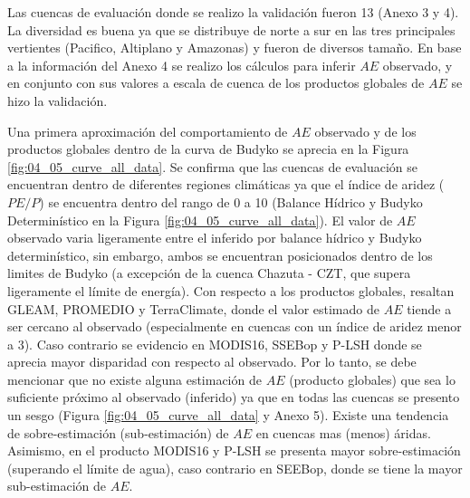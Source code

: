 \documentclass[12pt]{article}
\begin{document}
\clearpage

\clearpage

\clearpage
Las cuencas de evaluación donde se realizo la validación fueron 13 (Anexo 3 y 4). La diversidad es buena ya que se distribuye de norte a sur en las tres principales vertientes (Pacifico, Altiplano y Amazonas) y fueron de diversos tamaño. En base a la información del Anexo 4 se realizo los cálculos para inferir $AE$ observado, y en conjunto con sus valores a escala de cuenca de los productos globales de $AE$ se hizo la validación. 

Una primera aproximación del comportamiento de $AE$ observado y de los productos globales dentro de la curva de Budyko se aprecia en la Figura \ref{fig:04_05_curve_all_data}. Se confirma que las cuencas de evaluación se encuentran dentro de diferentes regiones climáticas ya que el índice de aridez ($PE/P$) se encuentra dentro del rango de 0 a 10 (Balance Hídrico y Budyko Determinístico en la Figura \ref{fig:04_05_curve_all_data}). El valor de $AE$ observado varia ligeramente entre el inferido por balance hídrico y Budyko determinístico, sin embargo, ambos se encuentran posicionados dentro de los limites de Budyko (a excepción de la cuenca Chazuta - CZT, que supera ligeramente el límite de energía). Con respecto a los productos globales, resaltan GLEAM, PROMEDIO y TerraClimate, donde el valor estimado de $AE$ tiende a ser cercano al observado (especialmente en cuencas con un índice de aridez menor a 3). Caso contrario se evidencio en MODIS16, SSEBop y P-LSH donde se aprecia mayor disparidad con respecto al observado. Por lo tanto, se debe mencionar que no existe alguna estimación de $AE$ (producto globales) que sea lo suficiente próximo al observado (inferido) ya que en todas las cuencas se presento un sesgo (Figura \ref{fig:04_05_curve_all_data} y Anexo 5). Existe una tendencia de sobre-estimación (sub-estimación) de $AE$ en cuencas mas (menos) áridas. Asimismo, en el producto MODIS16 y P-LSH se presenta mayor sobre-estimación (superando el límite de agua), caso contrario en SEEBop, donde se tiene la mayor sub-estimación de $AE$.
\end{document}

